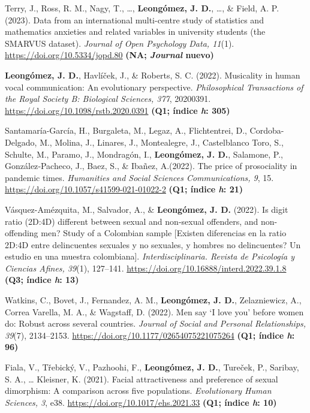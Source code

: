 \documentclass[11pt,a4paper,]{awesome-cv}
\begin{document}
Terry, J., Ross, R. M., Nagy, T., \ldots, \textbf{Leongómez, J. D.},
\ldots, \& Field, A. P. (2023). Data from an international multi-centre
study of statistics and mathematics anxieties and related variables in
university students (the SMARVUS dataset). \emph{Journal of Open
Psychology Data, 11}(1). \url{https://doi.org/10.5334/jopd.80}
\textbf{(NA; \emph{Journal} nuevo)}

\textbf{Leongómez, J. D.}, Havlíček, J., \& Roberts, S. C. (2022).
Musicality in human vocal communication: An evolutionary perspective.
\emph{Philosophical Transactions of the Royal Society B: Biological
Sciences, 377}, 20200391. \url{https://doi.org/10.1098/rstb.2020.0391}
\textbf{(Q1; índice \emph{h}: 305)}

Santamaría-García, H., Burgaleta, M., Legaz, A., Flichtentrei, D.,
Cordoba-Delgado, M., Molina, J., Linares, J., Montealegre, J.,
Castelblanco Toro, S., Schulte, M., Paramo, J., Mondragón, I.,
\textbf{Leongómez, J. D.}, Salamone, P., González‑Pacheco, J., Baez, S.,
\& Ibañez, A.(2022). The price of prosociality in pandemic times.
\emph{Humanities and Social Sciences Communications, 9}, 15.
\url{https://doi.org/10.1057/s41599-021-01022-2} \textbf{(Q1; índice
\emph{h}: 21)}

Vásquez-Amézquita, M., Salvador, A., \& \textbf{Leongómez, J. D.}
(2022). Is digit ratio (2D:4D) different between sexual and non-sexual
offenders, and non-offending men? Study of a Colombian sample {[}Existen
diferencias en la ratio 2D:4D entre delincuentes sexuales y no sexuales,
y hombres no delincuentes? Un estudio en una muestra colombiana{]}.
\emph{Interdisciplinaria. Revista de Psicología y Ciencias Afines,
39}(1), 127--141. \url{https://doi.org/10.16888/interd.2022.39.1.8}
\textbf{(Q3; índice \emph{h}: 13)}

Watkins, C., Bovet, J., Fernandez, A. M., \textbf{Leongómez, J. D.},
Zelazniewicz, A., Correa Varella, M. A., \& Wagstaff, D. (2022). Men say
`I love you' before women do: Robust across several countries.
\emph{Journal of Social and Personal Relationships, 39}(7), 2134--2153.
\url{https://doi.org/10.1177/02654075221075264} \textbf{(Q1; índice
\emph{h}: 96)}

Fiala, V., Třebický, V., Pazhoohi, F., \textbf{Leongómez, J. D.},
Tureček, P., Saribay, S. A., \ldots{} Kleisner, K. (2021). Facial
attractiveness and preference of sexual dimorphism: A comparison across
five populations. \emph{Evolutionary Human Sciences, 3}, e38.
\url{https://doi.org/10.1017/ehs.2021.33} \textbf{(Q1; índice \emph{h}:
10)}
\end{document}
